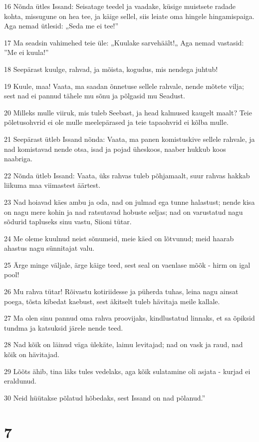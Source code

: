 \par 16 Nõnda ütles Issand: Seisatage teedel ja vaadake, küsige muistsete radade kohta, missugune on hea tee, ja käige sellel, siis leiate oma hingele hingamispaiga. Aga nemad ütlesid: „Seda me ei tee!”
\par 17 Ma seadsin vahimehed teie üle: „Kuulake sarvehäält!„ Aga nemad vastasid: ”Me ei kuula!”
\par 18 Seepärast kuulge, rahvad, ja mõista, kogudus, mis nendega juhtub!
\par 19 Kuule, maa! Vaata, ma saadan õnnetuse sellele rahvale, nende mõtete vilja; sest nad ei pannud tähele mu sõnu ja põlgasid mu Seadust.
\par 20 Milleks mulle viiruk, mis tuleb Seebast, ja head kalmused kaugelt maalt? Teie põletusohvrid ei ole mulle meelepärased ja teie tapaohvrid ei kõlba mulle.
\par 21 Seepärast ütleb Issand nõnda: Vaata, ma panen komistuskive sellele rahvale, ja nad komistavad nende otsa, isad ja pojad üheskoos, naaber hukkub koos naabriga.
\par 22 Nõnda ütleb Issand: Vaata, üks rahvas tuleb põhjamaalt, suur rahvas hakkab liikuma maa viimastest äärtest.
\par 23 Nad hoiavad käes ambu ja oda, nad on julmad ega tunne halastust; nende kisa on nagu mere kohin ja nad ratsutavad hobuste seljas; nad on varustatud nagu sõdurid tapluseks sinu vastu, Siioni tütar.
\par 24 Me oleme kuulnud neist sõnumeid, meie käed on lõtvunud; meid haarab ahastus nagu sünnitajat valu.
\par 25 Ärge minge väljale, ärge käige teed, sest seal on vaenlase mõõk - hirm on igal pool!
\par 26 Mu rahva tütar! Rõivastu kotiriidesse ja püherda tuhas, leina nagu ainsat poega, tõsta kibedat kaebust, sest äkitselt tuleb hävitaja meile kallale.
\par 27 Ma olen sinu pannud oma rahva proovijaks, kindlustatud linnaks, et sa õpiksid tundma ja katsuksid järele nende teed.
\par 28 Nad kõik on läinud väga ülekäte, laimu levitajad; nad on vask ja raud, nad kõik on hävitajad.
\par 29 Lõõts ähib, tina läks tules vedelaks, aga kõik sulatamine oli asjata - kurjad ei eraldunud.
\par 30 Neid hüütakse põlatud hõbedaks, sest Issand on nad põlanud.”

\chapter{7}

